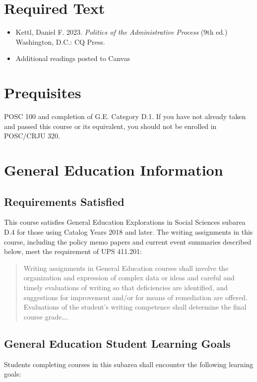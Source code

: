 \documentclass[12pt, letterpaper]{article}
\begin{document}
\section*{Required Text}

\begin{itemize}
    \item Kettl, Daniel F. 2023. \emph{Politics of the Administrative Process} (9th ed.) Washington, D.C.: CQ Press.
    \item Additional readings posted to Canvas
\end{itemize}

\section*{Prequisites}

POSC 100 and completion of G.E. Category D.1.  If you have not already taken and passed this course or its equivalent, you should not be enrolled in POSC/CRJU 320.

\section*{General Education Information}


\subsection*{Requirements Satisfied}

	This course satisfies General Education Explorations in Social Sciences subarea D.4 for those using Catalog Years 2018 and later. The writing assignments in this course, including the policy memo papers and current event summaries described below, meet the requirement of UPS 411.201: 
	\begin{quote}Writing assignments in General Education courses shall involve the organization and expression of complex data or ideas and careful and timely evaluations of writing so that deficiencies are identified, and suggestions for improvement and/or for means of remediation are offered. Evaluations of the student's writing competence shall determine the final course grade\ldots .\end{quote}

\subsection*{General Education Student Learning Goals}

	Students completing courses in this subarea shall encounter the following learning goals:
\end{document}
